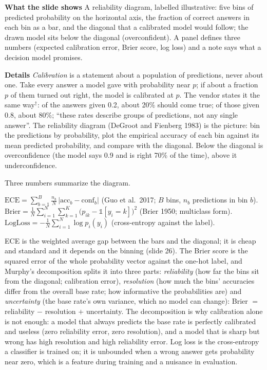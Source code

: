 \documentclass[11pt,letterpaper]{article}
\newcommand{\para}[1]{\medskip\noindent\textbf{#1}\quad}
\newenvironment{formulas}{\begin{tcolorbox}[formulabox]}{\end{tcolorbox}}
\newcommand{\ECE}{\mathrm{ECE}}
\begin{document}
\para{What the slide shows} A reliability diagram, labelled illustrative: five bins of predicted probability on the horizontal axis, the fraction of correct answers in each bin as a bar, and the diagonal that a calibrated model would follow; the drawn model sits below the diagonal (overconfident). A panel defines three numbers (expected calibration error, Brier score, log loss) and a note says what a decision model promises.

\para{Details} \emph{Calibration} is a statement about a population of predictions, never about one. Take every answer a model gave with probability near $p$; if about a fraction $p$ of them turned out right, the model is calibrated at $p$. The vendor states it the same way$^\dagger$: of the answers given 0.2, about 20\% should come true; of those given 0.8, about 80\%; ``these rates describe groups of predictions, not any single answer''. The reliability diagram (DeGroot and Fienberg 1983) is the picture: bin the predictions by probability, plot the empirical accuracy of each bin against its mean predicted probability, and compare with the diagonal. Below the diagonal is overconfidence (the model says 0.9 and is right 70\% of the time), above it underconfidence.

Three numbers summarize the diagram.
\begin{formulas}
$\displaystyle \ECE=\sum_{b=1}^{B}\frac{n_b}{N}\,\bigl|\mathrm{acc}_b-\mathrm{conf}_b\bigr|$ \qquad (Guo et al.\ 2017; $B$ bins, $n_b$ predictions in bin $b$).\\[4pt]
$\displaystyle \mathrm{Brier}=\frac1N\sum_{i=1}^{N}\sum_{k=1}^{K}\bigl(p_{ik}-\mathbb 1[y_i=k]\bigr)^2$ \qquad (Brier 1950; multiclass form).\\[4pt]
$\displaystyle \mathrm{LogLoss}=-\frac1N\sum_{i=1}^{N}\log p_i(y_i)$ \qquad (cross-entropy against the label).
\end{formulas}
ECE is the weighted average gap between the bars and the diagonal; it is cheap and standard and it depends on the binning (slide 26). The Brier score is the squared error of the whole probability vector against the one-hot label, and Murphy's decomposition splits it into three parts: \emph{reliability} (how far the bins sit from the diagonal; calibration error), \emph{resolution} (how much the bins' accuracies differ from the overall base rate; how informative the probabilities are) and \emph{uncertainty} (the base rate's own variance, which no model can change): Brier $=$ reliability $-$ resolution $+$ uncertainty. The decomposition is why calibration alone is not enough: a model that always predicts the base rate is perfectly calibrated and useless (zero reliability error, zero resolution), and a model that is sharp but wrong has high resolution and high reliability error. Log loss is the cross-entropy a classifier is trained on; it is unbounded when a wrong answer gets probability near zero, which is a feature during training and a nuisance in evaluation.
\end{document}
